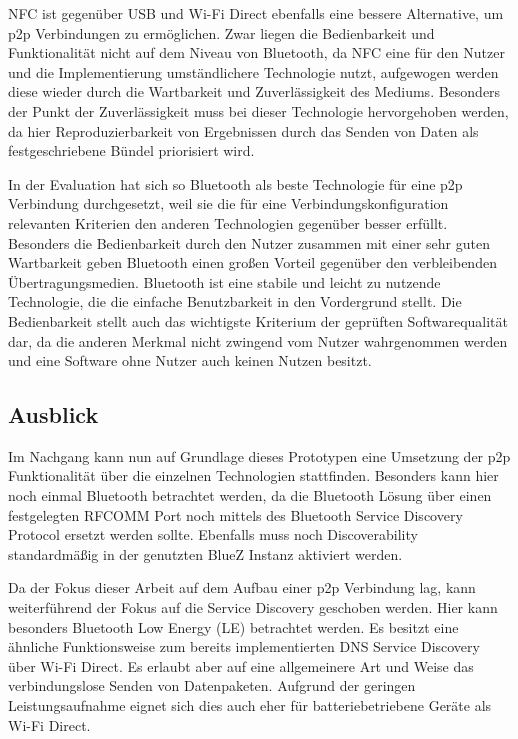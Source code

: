 NFC ist gegenüber USB und Wi-Fi Direct ebenfalls eine bessere Alternative, um p2p Verbindungen zu ermöglichen. Zwar liegen die Bedienbarkeit und Funktionalität nicht auf dem Niveau von Bluetooth, da NFC eine für den Nutzer und die Implementierung umständlichere Technologie nutzt, aufgewogen werden diese wieder durch die Wartbarkeit und Zuverlässigkeit des Mediums. Besonders der Punkt der Zuverlässigkeit muss bei dieser Technologie hervorgehoben werden, da hier Reproduzierbarkeit von Ergebnissen durch das Senden von Daten als festgeschriebene Bündel priorisiert wird.

In der Evaluation hat sich so Bluetooth als beste Technologie für eine p2p Verbindung durchgesetzt, weil sie die für eine Verbindungskonfiguration relevanten Kriterien den anderen Technologien gegenüber besser erfüllt. Besonders die Bedienbarkeit durch den Nutzer zusammen mit einer sehr guten Wartbarkeit geben Bluetooth einen großen Vorteil gegenüber den verbleibenden Übertragungsmedien. Bluetooth ist eine stabile und leicht zu nutzende Technologie, die die einfache Benutzbarkeit in den Vordergrund stellt. Die Bedienbarkeit stellt auch das wichtigste Kriterium  der geprüften Softwarequalität dar, da die anderen Merkmal nicht zwingend vom Nutzer wahrgenommen werden und eine Software ohne Nutzer auch keinen Nutzen besitzt.

\subsection{Ausblick}

Im Nachgang kann nun auf Grundlage dieses Prototypen eine Umsetzung der p2p Funktionalität über die einzelnen Technologien stattfinden. Besonders kann hier noch einmal Bluetooth betrachtet werden, da die Bluetooth Lösung über einen festgelegten RFCOMM Port noch mittels des Bluetooth Service Discovery Protocol ersetzt werden sollte. Ebenfalls muss noch Discoverability standardmäßig in der genutzten BlueZ Instanz aktiviert werden.

Da der Fokus dieser Arbeit auf dem Aufbau einer p2p Verbindung lag, kann weiterführend der Fokus auf die Service Discovery geschoben werden. Hier kann besonders Bluetooth Low Energy (LE) betrachtet werden. Es besitzt eine ähnliche Funktionsweise zum bereits implementierten DNS Service Discovery über Wi-Fi Direct. Es erlaubt aber auf eine allgemeinere Art und Weise das verbindungslose Senden von Datenpaketen. Aufgrund der geringen Leistungsaufnahme eignet sich dies auch eher für batteriebetriebene Geräte als Wi-Fi Direct.

